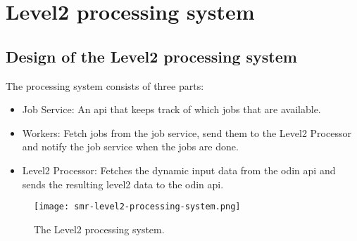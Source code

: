 \chapter{Level2 processing system}

\section{Design of the Level2 processing system}

The processing system consists of three parts:

\begin{itemize}
\item Job Service: An api that keeps track of which jobs that are available.
\item Workers: Fetch jobs from the job service, send them to the Level2
  Processor and notify the job service when the jobs are done.
\item Level2 Processor: Fetches the dynamic input data from the odin api
  and sends the resulting level2 data to the odin api.
\end{itemize}

\begin{figure}[h]
  \centering
  \texttt{[image: smr-level2-processing-system.png]}
  \caption{The Level2 processing system.}
  \label{fig:processing}
\end{figure}
